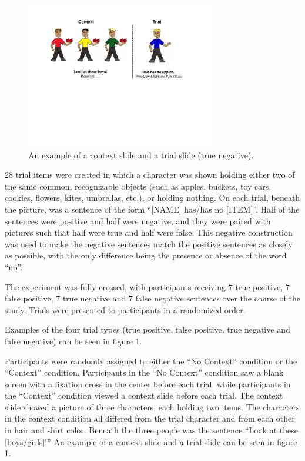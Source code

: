\documentclass[10pt,letterpaper]{article}
\begin{document}
\begin{figure}[t]
\begin{center} 
\includegraphics[width=3.25in]{figures/negatron_trialfig2.pdf}
\caption{\label{fig:trial} An example of a context slide and a trial slide (true negative). }
\vspace{-5mm}
\end{center} 
\end{figure}

28 trial items were created in which a character was shown holding either two of the same common, recognizable objects (such as apples, buckets, toy cars, cookies, flowers, kites, umbrellas, etc.), or holding nothing.  On each trial, beneath the picture, was a sentence of the form ``[NAME] has/has no [ITEM]''.  Half of the sentences were positive and half were negative, and they were paired with pictures such that half were true and half were false.  This negative construction was used to make the negative sentences match the positive sentences as closely as possible, with the only difference being the presence or absence of the word ``no''.  

The experiment was fully crossed, with participants receiving 7 true positive, 7 false positive, 7 true negative and 7 false negative sentences over the course of the study.  Trials were presented to participants in a randomized order.

Examples of the four trial types (true positive, false positive, true negative and false negative) can be seen in figure 1.    

Participants were randomly assigned to either the ``No Context'' condition or the ``Context'' condition.  Participants in the ``No Context'' condition saw a blank screen with a fixation cross in the center before each trial, while participants in the ``Context'' condition viewed a context slide before each trial.  The context slide showed a picture of three characters, each holding two items.  The characters in the context condition all differed from the trial character and from each other in hair and shirt color.  Beneath the three people was the sentence ``Look at these [boys/girls]!''  An example of a context slide and a trial slide can be seen in figure 1.  
\end{document}
